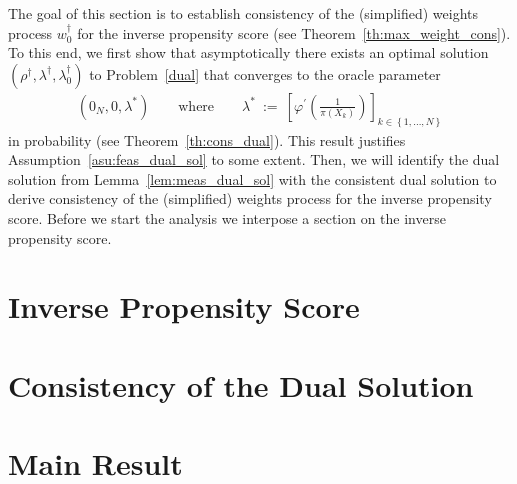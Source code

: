 The goal of this section is to establish consistency of the
(simplified) weights process $w_0^\dagger$ for the inverse propensity score (see Theorem~\ref{th:max_weight_cons}).
To this end,
we first show that asymptotically there exists an optimal solution 
$
(\rho^\dagger,\lambda^\dagger,\lambda_0^\dagger)
$
to Problem~\ref{dual} that converges to the oracle parameter
\begin{align*}
  (0_N,0,\lambda^*)
  \qquad
  \text{where}
  \qquad
  \lambda^*
  \ 
  :=
  \ 
\left[ 
\varphi^{'} \left( \frac{1}{\pi(X_k)} \right)
\right]_{k\in \left\{ 1,\ldots,N \right\}}
\end{align*}
in probability (see Theorem~\ref{th:cons_dual}).
This result justifies Assumption~\ref{asu:feas_dual_sol} to some extent.
Then, we will identify the dual solution from Lemma~\ref{lem:meas_dual_sol} 
with the consistent dual solution to derive consistency of the (simplified) weights process for the inverse propensity score.
Before we start the analysis we interpose a section on the inverse propensity score.
\section{Inverse Propensity Score}
  
\section{Consistency of the Dual Solution}
  
\section{Main Result}



